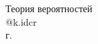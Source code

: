 \begin{titlepage}
    \vspace*{\fill}
    \begin{center}
        {\Huge{Теория вероятностей}}\\[0.5cm]
        {\Large{@k.idcr}}\\[0.4cm]
        \the\year{} г.
    \end{center}
    \vspace*{\fill}
\end{titlepage}
